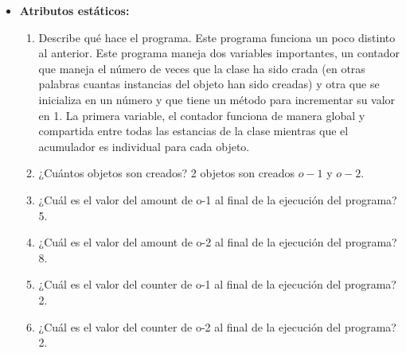 \documentclass{article}
\begin{document}
\begin{itemize}
    \item \textbf{Atributos estáticos:}
    \begin{enumerate}
        \item Describe qué hace el programa.
        Este programa funciona un poco distinto al anterior. Este programa maneja dos variables importantes, un contador que maneja el número de veces que la clase ha sido crada (en otras palabras cuantas instancias del objeto han sido creadas) y otra que se inicializa en un número y que tiene un método para incrementar su valor en 1. La primera variable, el contador funciona de manera global y compartida entre todas las estancias de la clase mientras que el acumulador es individual para cada objeto.
        \item ¿Cuántos objetos son creados?
        2 objetos son creados $o-1$ y $o-2$.
        \item ¿Cuál es el valor del amount de o-1 al final de la ejecución del programa?
        5.
        \item ¿Cuál es el valor del amount de o-2 al final de la ejecución del programa?
        8.
        \item ¿Cuál es el valor del counter de o-1 al final de la ejecución del programa?
        2.
        \item ¿Cuál es el valor del counter de o-2 al final de la ejecución del programa?
        2.
        
    \end{enumerate}
    
\end{itemize}
\end{document}
